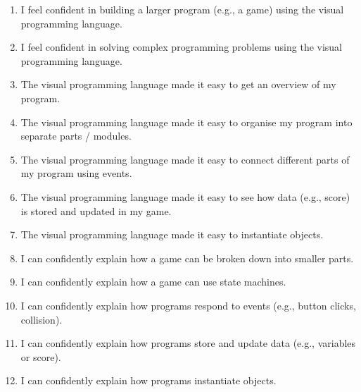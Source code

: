 \begin{enumerate}
	\item I feel confident in building a larger program (e.g., a game) using the visual programming language.
	\item I feel confident in solving complex programming problems using the visual programming language.
	\item The visual programming language made it easy to get an overview of my program.
	\item The visual programming language made it easy to organise my program into separate parts / modules.
	\item The visual programming language made it easy to connect different parts of my program using events.
	\item The visual programming language made it easy to see how data (e.g., score) is stored and updated in my game.
	\item The visual programming language made it easy to instantiate objects.
	\item I can confidently explain how a game can be broken down into smaller parts.
	\item I can confidently explain how a game can use state machines.
	\item I can confidently explain how programs respond to events (e.g., button clicks, collision).
	\item I can confidently explain how programs store and update data (e.g., variables or score).
	\item I can confidently explain how programs instantiate objects.
\end{enumerate}
